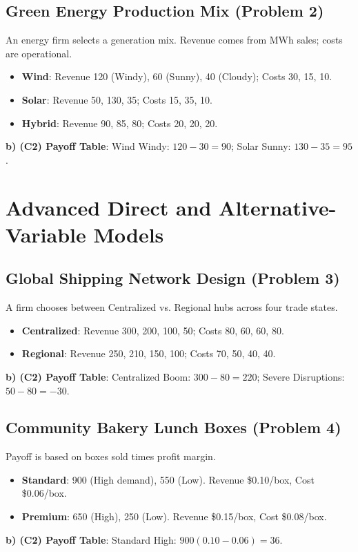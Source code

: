 	\subsection{Green Energy Production Mix (Problem 2)}
	An energy firm selects a generation mix. Revenue comes from MWh sales; costs are operational.
	\begin{itemize}
		\item \textbf{Wind}: Revenue 120 (Windy), 60 (Sunny), 40 (Cloudy); Costs 30, 15, 10.
		\item \textbf{Solar}: Revenue 50, 130, 35; Costs 15, 35, 10.
		\item \textbf{Hybrid}: Revenue 90, 85, 80; Costs 20, 20, 20.
	\end{itemize}
	\textbf{b) (C2) Payoff Table}: Wind Windy: $120-30=90$; Solar Sunny: $130-35=95$.
	
	\section{Advanced Direct and Alternative-Variable Models}
	
	\subsection{Global Shipping Network Design (Problem 3)}
	A firm chooses between Centralized vs. Regional hubs across four trade states.
	\begin{itemize}
		\item \textbf{Centralized}: Revenue 300, 200, 100, 50; Costs 80, 60, 60, 80.
		\item \textbf{Regional}: Revenue 250, 210, 150, 100; Costs 70, 50, 40, 40.
	\end{itemize}
	\textbf{b) (C2) Payoff Table}: Centralized Boom: $300-80=220$; Severe Disruptions: $50-80=-30$.
	
	\subsection{Community Bakery Lunch Boxes (Problem 4)}
	Payoff is based on boxes sold times profit margin.
	\begin{itemize}
		\item \textbf{Standard}: 900 (High demand), 550 (Low). Revenue \$0.10/box, Cost \$0.06/box.
		\item \textbf{Premium}: 650 (High), 250 (Low). Revenue \$0.15/box, Cost \$0.08/box.
	\end{itemize}
	\textbf{b) (C2) Payoff Table}: Standard High: $900(0.10-0.06)=36$.
	
